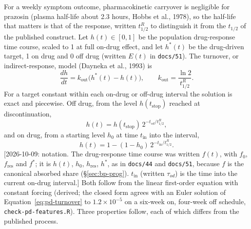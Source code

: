 \documentclass[11pt]{article}
\newcommand{\note}[1]{\textcolor{blue!60!black}{\small [#1]}}
\newcommand{\code}[1]{\texttt{#1}}
\begin{document}
For a weekly symptom outcome, pharmacokinetic carryover is negligible
for prazosin (plasma half-life about 2.3 hours, Hobbs et al., 1978),
so the half-life that matters is that of the response, written
$t_{1/2}^{R}$ to distinguish it from the $t_{1/2}$ of the published
construct. Let $h(t) \in [0,1]$ be the population drug-response time
course, scaled to 1 at full on-drug effect, and let $h^{\ast}(t)$ be
the drug-driven target, 1 on drug and 0 off drug (written $E(t)$ in
\code{docs/51}). The turnover, or indirect-response, model (Dayneka
et al., 1993) is
\begin{equation}
\frac{dh}{dt} = k_{\text{out}}\big(h^{\ast}(t) - h(t)\big), \qquad
k_{\text{out}} = \frac{\ln 2}{t_{1/2}^{R}}.
\label{eq:pd-turnover}
\end{equation}
For a target constant within each on-drug or off-drug interval the
solution is exact and piecewise. Off drug, from the level
$h(t_{\text{stop}})$ reached at discontinuation,
\begin{equation}
h(t) = h(t_{\text{stop}})\, 2^{-t_{sd}/t_{1/2}^{R}},
\label{eq:pd-offset}
\end{equation}
and on drug, from a starting level $h_0$ at time $t_{\text{in}}$ into the
interval,
\begin{equation}
h(t) = 1 - (1 - h_0)\, 2^{-t_{\text{in}}/t_{1/2}^{R}} .
\label{eq:pd-onset}
\end{equation}
\note{2026-10-09: notation. The drug-response time course was written
$f(t)$, with $f_0$, $f_{\text{res}}$ and $f^{\ast}$; it is $h(t)$,
$h_0$, $h_{\text{res}}$, $h^{\ast}$, as in \code{docs/44} and
\code{docs/51}, because $f$ is the canonical absorbed share
(\S\ref{sec:bp-prog}). $t_{\text{in}}$ (written $\tau_{od}$) is the
time into the current on-drug interval.}
Both follow from the linear first-order equation with constant forcing
(derived; the closed form agrees with an Euler solution of
Equation~\eqref{eq:pd-turnover} to $1.2\times10^{-5}$ on a six-week
on, four-week off schedule, \code{check-pd-features.R}). Three properties
follow, each of which differs from the published process.
\end{document}
